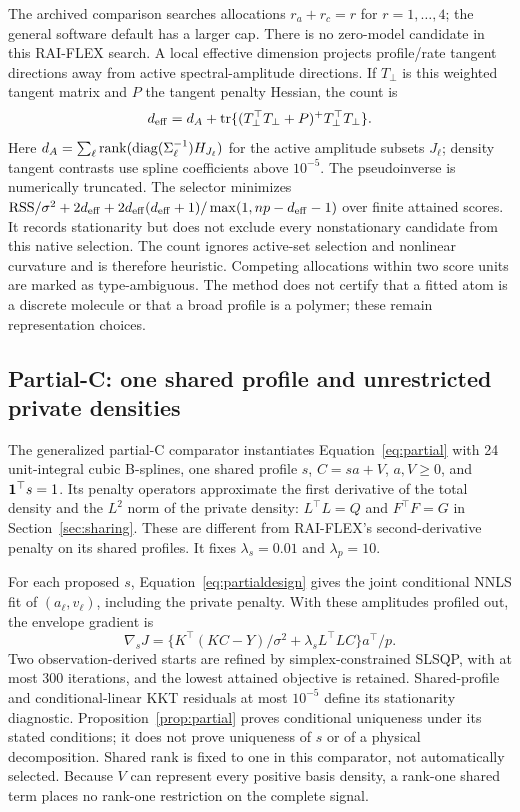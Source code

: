 The archived comparison searches allocations $r_a+r_c=r$ for $r=1,\ldots,4$; the general software default has a larger cap. There is no zero-model candidate in this RAI-FLEX search. A local effective dimension projects profile/rate tangent directions away from active spectral-amplitude directions. If $T_\perp$ is this weighted tangent matrix and $P$ the tangent penalty Hessian, the count is
\begin{equation}\label{eq:flexdf}
 d_{\rm eff}=d_A+\operatorname{tr}\{(T_\perp^\top T_\perp+P)^+
                                      T_\perp^\top T_\perp\}.
\end{equation}
Here $d_A=\sum_\ell\operatorname{rank}(\operatorname{diag}(\Sigma_\ell^{-1})H_{J_\ell})$ for the active amplitude subsets $J_\ell$; density tangent contrasts use spline coefficients above $10^{-5}$. The pseudoinverse is numerically truncated. The selector minimizes $\mathrm{RSS}/\sigma^2+2d_{\rm eff}+2d_{\rm eff}(d_{\rm eff}+1)/\max(1,np-d_{\rm eff}-1)$ over finite attained scores. It records stationarity but does not exclude every nonstationary candidate from this native selection. The count ignores active-set selection and nonlinear curvature and is therefore heuristic. Competing allocations within two score units are marked as type-ambiguous. The method does not certify that a fitted atom is a discrete molecule or that a broad profile is a polymer; these remain representation choices.

\subsection{Partial-C: one shared profile and unrestricted private densities}\label{app:partialalgorithm}
The generalized partial-C comparator instantiates Equation~\eqref{eq:partial} with 24 unit-integral cubic B-splines, one shared profile $s$, $C=sa+V$, $a,V\geq0$, and $\mathbf{1}^\top s=1$. Its penalty operators approximate the first derivative of the total density and the $L^2$ norm of the private density: $L^\top L=Q$ and $F^\top F=G$ in Section~\ref{sec:sharing}. These are different from RAI-FLEX's second-derivative penalty on its shared profiles. It fixes $\lambda_s=0.01$ and $\lambda_p=10$.

For each proposed $s$, Equation~\eqref{eq:partialdesign} gives the joint conditional NNLS fit of $(a_\ell,v_\ell)$, including the private penalty. With these amplitudes profiled out, the envelope gradient is
\begin{equation}\label{eq:partialgradient}
 \nabla_s J=\{K^\top(KC-Y)/\sigma^2+\lambda_sL^\top LC\}a^\top/p.
\end{equation}
Two observation-derived starts are refined by simplex-constrained SLSQP, with at most 300 iterations, and the lowest attained objective is retained. Shared-profile and conditional-linear KKT residuals at most $10^{-5}$ define its stationarity diagnostic. Proposition~\ref{prop:partial} proves conditional uniqueness under its stated conditions; it does not prove uniqueness of $s$ or of a physical decomposition. Shared rank is fixed to one in this comparator, not automatically selected. Because $V$ can represent every positive basis density, a rank-one shared term places no rank-one restriction on the complete signal.

